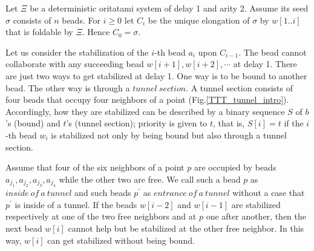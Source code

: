 \documentclass[runningheads]{llncs}
\begin{document}


Let $\Xi$ be a deterministic oritatami system of delay 1 and arity 2. Assume its seed $\sigma$ consists of $n$ beads.
For $i \geq 0$ let $C_i$ be the unique elongation of $\sigma$ by $w[1..i]$ that is foldable by $\Xi$. Hence $C_0 = \sigma$.


Let us consider the stabilization of the $i$-th bead $a_i$ upon $C_{i-1}$. The bead cannot collaborate with any succeeding bead $w[i+1],w[i+2],\cdots$ at delay 1. There are just two ways to get stabilized at delay 1. One way is to be bound to another bead. The other way is through a $tunnel\ section$. A tunnel section consists of four beads that occupy four neighbors of a point (Fig.\ref{TTT_tunnel_intro}). 
Accordingly, how they are stabilized can be described by a binary sequence $S$ of $b$'s (bound) and $t$'s (tunnel section); priority is given to $t$, that is, $S[i] = t$ if the $i$-th bead $w_i$ is stabilized not only by being bound but also through a tunnel section. 

Assume that four of the six neighbors of a point $p$ are occupied by beads $a_{j_1},a_{j_2},a_{j_3},a_{j_4}$ while the other two are free. We call such a bead $p$ as $inside\ of\ a\ tunnel$ and such beads $p^\prime$ as $entrance\ of\ a\ tunnel$ without a case that $p^\prime$ is inside of a tunnel. If the beads $w[i-2]$ and $w[i-1]$ are stabilized respectively at one of the two free neighbors and at $p$ one after another, then the next bead $w[i]$ cannot help but be stabilized at the other free neighbor. In this way, $w[i]$ can get stabilized without being bound.

\end{document}
